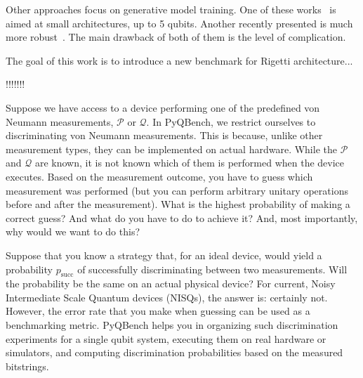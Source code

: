 \documentclass[preprint,12pt, a4paper, dvipsnames]{elsarticle}
\newcommand{\1}{{\rm 1\hspace{-0.9mm}l}}
\newcommand{\PP}{\mathcal{P}}
\newcommand{\QQ}{\mathcal{Q}}
\begin{document}
Other approaches focus on generative model training. One of these
works~\cite{hamilton2018generative} is aimed at small architectures, up to 5
qubits. Another recently presented is much more
robust~\cite{benedetti2018generative}. The main drawback of both of them is the
level of complication.



The goal of this work is to introduce a new benchmark for Rigetti
architecture...


\label{}

!!!!!!!




Suppose we have access to a device performing one of the predefined von Neumann
measurements, $\PP$ or $\QQ$. In PyQBench, we restrict ourselves to discriminating von Neumann measurements.
This is because, unlike other measurement types, they can be implemented on actual hardware. While the $\PP$ and $\QQ$ are known, it is not known which of them is
performed when the device executes. Based on the measurement outcome, you have to guess which
measurement was performed (but you can perform arbitrary unitary operations before and after the
measurement). What is the highest probability of making a correct guess? And what do you have to do
to achieve it? And, most importantly, why would we want to do this?

Suppose that you know a strategy that, for an ideal device, would yield a probability
$p_{\text{succ}}$ of successfully discriminating between two measurements. Will the probability be
the same on an actual physical device? For current, Noisy Intermediate Scale Quantum devices
(NISQs), the answer is: certainly not. However, the error rate that you make when guessing can be
used as a benchmarking metric. PyQBench helps you in organizing such discrimination experiments for
a single qubit system, executing them on real hardware or simulators, and
computing discrimination probabilities based on the measured bitstrings.
\end{document}
